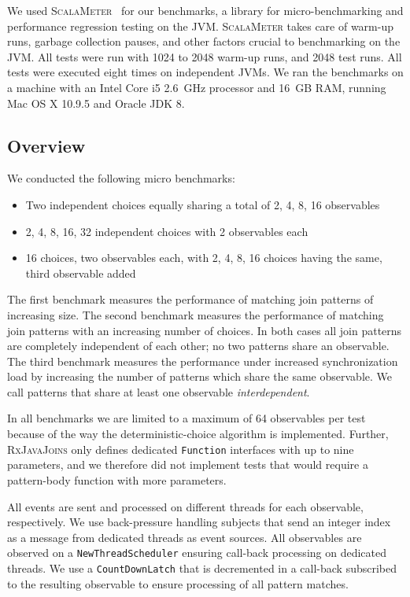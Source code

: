 \documentclass[runningheads]{llncs}
\begin{document}
\begin{sloppypar}
We used \textsc{ScalaMeter}~\cite{ScalaMeter} for our benchmarks, a library
for micro-benchmarking and performance regression testing on the JVM.
\textsc{ScalaMeter} takes care of warm-up runs, garbage collection pauses, and
other factors crucial to benchmarking on the JVM. All tests were run with 1024
to 2048 warm-up runs, and 2048 test runs. All tests were executed eight times
on independent JVMs. We ran the benchmarks on a machine with an Intel Core i5
2.6~GHz processor and 16~GB RAM, running Mac OS X 10.9.5 and Oracle JDK 8.

\subsection{Overview}

We conducted the following micro benchmarks:

\begin{itemize}
\item Two independent choices equally sharing a total of 2, 4, 8, 16 observables
\item 2, 4, 8, 16, 32 independent choices with 2 observables each 
\item 16 choices, two observables each, with 2, 4, 8, 16 choices having the same, third observable added
\end{itemize}
\noindent
The first benchmark measures the performance of matching join patterns of
increasing size. The second benchmark measures the performance of matching
join patterns with an increasing number of choices. In both cases all join
patterns are completely independent of each other; no two patterns share an
observable. The third benchmark measures the performance under increased
synchronization load by increasing the number of patterns which share the same
observable. We call patterns that share at least one observable
\emph{interdependent}.

In all benchmarks we are limited to a maximum of 64 observables per test
because of the way the deterministic-choice algorithm is implemented. Further,
\textsc{RxJavaJoins} only defines dedicated \texttt{Function} interfaces with
up to nine parameters, and we therefore did not implement tests that would
require a pattern-body function with more parameters.

All events are sent and processed on different threads for each observable,
respectively. We use back-pressure handling subjects that send an integer
index as a message from dedicated threads as event sources. All observables
are observed on a \texttt{NewThreadScheduler} ensuring call-back processing on
dedicated threads. We use a \texttt{CountDownLatch} that is decremented in a
call-back subscribed to the resulting observable to ensure processing of all
pattern matches.


\end{sloppypar}
\end{document}
